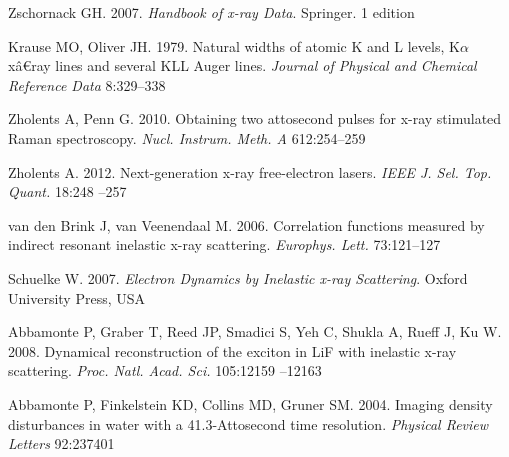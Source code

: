 \documentclass{ar-1col}
\begin{document}
\begin{thebibliography}{000}
Zschornack GH. 2007. \textit{Handbook of {x-ray} Data}. Springer. 1 edition

Krause MO, Oliver JH. 1979. Natural widths of atomic {K} and {L} levels,
  {K}$\alpha$ {xâ€ray} lines and several {KLL} {A}uger lines. \textit{Journal
  of Physical and Chemical Reference Data} 8:329--338


Zholents A, Penn G. 2010. Obtaining two attosecond pulses for x-ray stimulated
  {R}aman spectroscopy. \textit{Nucl. Instrum. Meth. A} 612:254--259

Zholents A. 2012. {Next-generation} {x-ray} {free-electron} lasers.
  \textit{{IEEE} J. Sel. Top. Quant.} 18:248 --257

{van den Brink} J, {van Veenendaal} M. 2006. Correlation functions measured by
  indirect resonant inelastic x-ray scattering. \textit{Europhys. Lett.}
  73:121--127

Schuelke W. 2007. \textit{Electron Dynamics by Inelastic {x-ray} Scattering}.
  Oxford University Press, {USA}

Abbamonte P, Graber T, Reed JP, Smadici S, Yeh C, Shukla A, Rueff J, Ku W.
  2008. Dynamical reconstruction of the exciton in {LiF} with inelastic x-ray
  scattering. \textit{Proc. Natl. Acad. Sci.} 105:12159 --12163

Abbamonte P, Finkelstein KD, Collins MD, Gruner SM. 2004. Imaging density
  disturbances in water with a {41.3-Attosecond} time resolution.
  \textit{Physical Review Letters} 92:237401

\end{thebibliography}
\end{document}
